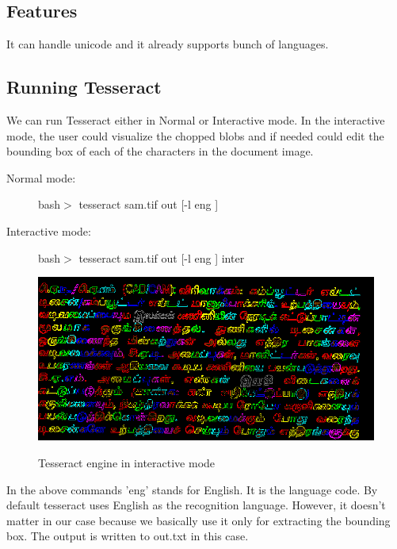 \subsection{Features}
It can handle unicode and it already supports bunch of languages.
\subsection{Running Tesseract}
We can run Tesseract either in Normal or Interactive mode. In the interactive mode, the user could visualize the chopped blobs and if needed could edit the bounding box of each of the characters in the document image.
\begin{description}
	\item[Normal mode:] bash$>$ tesseract sam.tif out [-l eng ]
	\item[Interactive mode:] bash$>$ tesseract sam.tif out [-l eng ] inter
\end{description}
\begin{figure}\centering
\includegraphics[scale=0.5]{./img/segment}\\
  \caption{Tesseract engine in interactive mode}\label{TESSS}
\end{figure}

In the above commands 'eng' stands for English. It is the language code. By default tesseract uses English as the recognition language. However, it doesn't matter in our case because we basically use it
only for extracting the bounding box.
The output is written to out.txt in this case.
